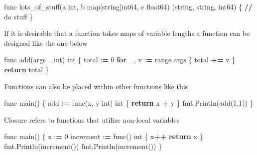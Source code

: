 \documentclass[]{book}
\newenvironment{Shaded}{\begin{snugshade}}{\end{snugshade}}
\newcommand{\BuiltInTok}[1]{#1}
\newcommand{\ControlFlowTok}[1]{\textcolor[rgb]{0.13,0.29,0.53}{\textbf{#1}}}
\newcommand{\DecValTok}[1]{\textcolor[rgb]{0.00,0.00,0.81}{#1}}
\newcommand{\NormalTok}[1]{#1}
\newcommand{\OperatorTok}[1]{\textcolor[rgb]{0.81,0.36,0.00}{\textbf{#1}}}
\begin{document}
\begin{Shaded}
\begin{Highlighting}[]
\NormalTok{func lots_of_stuff(a }\BuiltInTok{int}\NormalTok{, b }\BuiltInTok{map}\NormalTok{[string]int64, c float64) (string, string, int64) \{}
\OperatorTok{//}\NormalTok{ do stuff}
\NormalTok{\}}
\end{Highlighting}
\end{Shaded}

If it is desirable that a function takes maps of variable lengths a function can be designed like the one below

\begin{Shaded}
\begin{Highlighting}[]
\NormalTok{func add(args ...}\BuiltInTok{int}\NormalTok{) }\BuiltInTok{int}\NormalTok{ \{ }
\NormalTok{    total :}\OperatorTok{=} \DecValTok{0}              
    \ControlFlowTok{for}\NormalTok{ _, v :}\OperatorTok{=} \BuiltInTok{range}\NormalTok{ args \{}
\NormalTok{        total }\OperatorTok{+=}\NormalTok{ v          }
\NormalTok{    \}                       }
    \ControlFlowTok{return}\NormalTok{ total            }
\NormalTok{\}  }
\end{Highlighting}
\end{Shaded}

Functions can also be placed within other functions like this

\begin{Shaded}
\begin{Highlighting}[]
\NormalTok{func main() \{}
\NormalTok{  add :}\OperatorTok{=}\NormalTok{ func(x, y }\BuiltInTok{int}\NormalTok{) }\BuiltInTok{int}\NormalTok{ \{}
    \ControlFlowTok{return}\NormalTok{ x }\OperatorTok{+}\NormalTok{ y}
\NormalTok{  \}}
\NormalTok{  fmt.Println(add(}\DecValTok{1}\NormalTok{,}\DecValTok{1}\NormalTok{))}
\NormalTok{\}}
\end{Highlighting}
\end{Shaded}

Closure refers to functions that utilize non-local variables

\begin{Shaded}
\begin{Highlighting}[]
\NormalTok{func main() \{}
\NormalTok{  x :}\OperatorTok{=} \DecValTok{0}
\NormalTok{  increment :}\OperatorTok{=}\NormalTok{ func() }\BuiltInTok{int}\NormalTok{ \{}
\NormalTok{    x}\OperatorTok{++}
    \ControlFlowTok{return}\NormalTok{ x}
\NormalTok{  \}}
\NormalTok{  fmt.Println(increment())}
\NormalTok{  fmt.Println(increment())}
\NormalTok{\}}
\end{Highlighting}
\end{Shaded}
\end{document}
